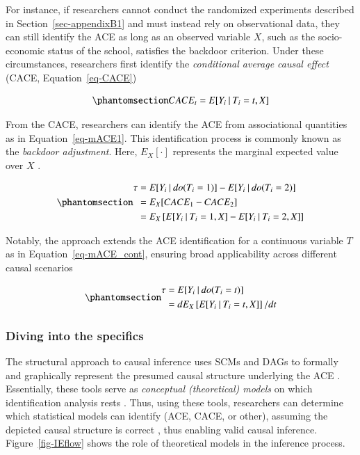 \documentclass[
  authoryear,
  review,
  1p]{elsarticle}
\begin{document}
For instance, if researchers cannot conduct the randomized experiments
described in Section~\ref{sec-appendixB1} and must instead rely on
observational data, they can still identify the ACE as long as an
observed variable \(X\), such as the socio-economic status of the
school, satisfies the backdoor criterion. Under these circumstances,
researchers first identify the \emph{conditional average causal effect}
(CACE, Equation~\ref{eq-CACE})

\begin{equation}\phantomsection\label{eq-CACE}{
CACE_{t} = E[Y_{i} \:|\:T_{i}=t, X]
}\end{equation}

From the CACE, researchers can identify the ACE from associational
quantities as in Equation~\ref{eq-mACE1}. This identification process is
commonly known as the \emph{backdoor adjustment}. Here, \(E_{X}[\cdot]\)
represents the marginal expected value over \(X\)
\citep{Morgan_et_al_2014}.

\begin{equation}\phantomsection\label{eq-mACE1}{
\begin{aligned}
  \tau & = E[Y_{i} \:|\:do(T_{i}=1)]- E[Y_{i} \:|\:do(T_{i}=2)] \\
  & = E_{X}[CACE_{1} - CACE_{2}] \\
  & = E_{X}\left[ E[Y_{i} \:|\:T_{i}=1, X] - E[Y_{i} \:|\:T_{i}=2, X] \right]
\end{aligned}
}\end{equation}

Notably, the approach extends the ACE identification for a continuous
variable \(T\) as in Equation~\ref{eq-mACE_cont}, ensuring broad
applicability across different causal scenarios
\citep[pp.~45]{Neal_2020}

\begin{equation}\phantomsection\label{eq-mACE_cont}{
\begin{aligned}
  \tau &= E[Y_{i} \:|\:do(T_{i}=t)] \\
  & = d E_{X}\left[ E[Y_{i} \:|\:T_{i}=t, X]\right]/ dt
  \end{aligned}
}\end{equation}

\subsubsection{Diving into the specifics}\label{sec-appendixB3}

The structural approach to causal inference uses SCMs and DAGs to
formally and graphically represent the presumed causal structure
underlying the ACE
\citep{Pearl_2009, Pearl_et_al_2016, Gross_et_al_2018, Neal_2020}.
Essentially, these tools serve as \emph{conceptual (theoretical) models}
on which identification analysis rests
\citep[pp.~4]{Schuessler_et_al_2023}. Thus, using these tools,
researchers can determine which statistical models can identify (ACE,
CACE, or other), assuming the depicted causal structure is correct
\citep{McElreath_2020}, thus enabling valid causal inference.
Figure~\ref{fig-IEflow} shows the role of theoretical models in the
inference process.
\end{document}
